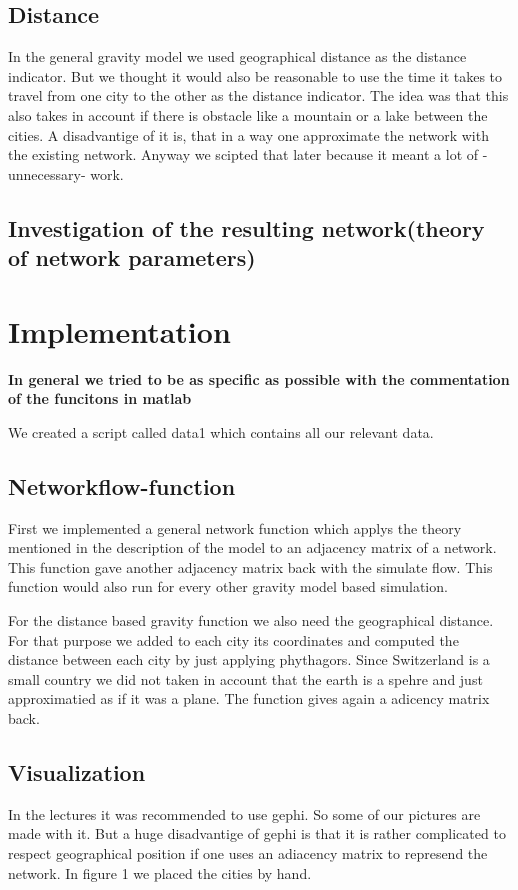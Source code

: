 \documentclass[11pt]{article}
\begin{document}
\subsection{Distance}
In the general gravity model we used geographical distance as the distance indicator. But we thought it would also be reasonable to use the time it takes to travel from one city to the other as the distance indicator. The idea was that this also takes in account if there is obstacle like a mountain or a lake between the cities. A disadvantige of it is, that in a way one approximate the network with the existing network. Anyway we scipted that later because it meant a lot of -unnecessary- work.


\subsection{Investigation of the resulting network(theory of network parameters)}



\section{Implementation}
\textbf{In general we tried to be as specific as possible with the commentation of the funcitons in matlab}

We created a script called data1 which contains all our relevant data.

\subsection{Networkflow-function}
First we implemented a general network function which applys the theory mentioned in the description of the model to an adjacency matrix of a network. This function gave another adjacency matrix back with the simulate flow. This function would also run for every other gravity model based simulation.\newline

For the distance based gravity function we also need the geographical distance. For that purpose we added to each city its coordinates and computed the distance between each city by just applying phythagors. Since Switzerland is a small country we did not taken in account that the earth is a spehre and just approximatied as if it was a plane. The function gives again a adicency matrix back.


\subsection{Visualization}
In the lectures it was recommended to use gephi. So some of our pictures are made with it. But a huge disadvantige of gephi is that it is rather complicated to respect geographical position if one uses an adiacency  matrix to represend the network. In figure 1 we placed the cities by hand.
\end{document}

